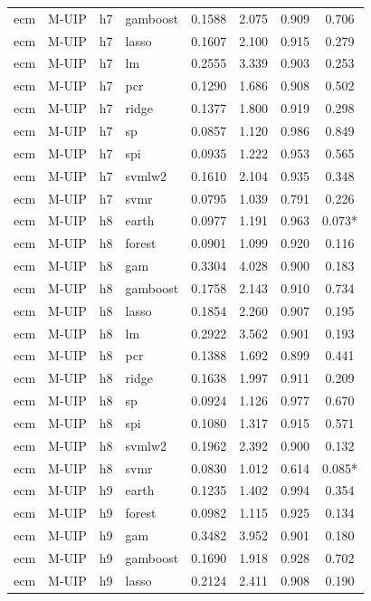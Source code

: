 \begin{ThreePartTable}
\begin{longtable}[t]{llclcccc}
ecm & M-UIP & h7 & gamboost & 0.1588 & 2.075 & 0.909 & 0.706\\
ecm & M-UIP & h7 & lasso & 0.1607 & 2.100 & 0.915 & 0.279\\
ecm & M-UIP & h7 & lm & 0.2555 & 3.339 & 0.903 & 0.253\\
ecm & M-UIP & h7 & pcr & 0.1290 & 1.686 & 0.908 & 0.502\\
ecm & M-UIP & h7 & ridge & 0.1377 & 1.800 & 0.919 & 0.298\\
ecm & M-UIP & h7 & sp & 0.0857 & 1.120 & 0.986 & 0.849\\
ecm & M-UIP & h7 & spi & 0.0935 & 1.222 & 0.953 & 0.565\\
ecm & M-UIP & h7 & svmlw2 & 0.1610 & 2.104 & 0.935 & 0.348\\
ecm & M-UIP & h7 & svmr & 0.0795 & 1.039 & 0.791 & 0.226\\
\addlinespace
ecm & M-UIP & h8 & earth & 0.0977 & 1.191 & 0.963 & 0.073*\\
ecm & M-UIP & h8 & forest & 0.0901 & 1.099 & 0.920 & 0.116\\
ecm & M-UIP & h8 & gam & 0.3304 & 4.028 & 0.900 & 0.183\\
ecm & M-UIP & h8 & gamboost & 0.1758 & 2.143 & 0.910 & 0.734\\
ecm & M-UIP & h8 & lasso & 0.1854 & 2.260 & 0.907 & 0.195\\
ecm & M-UIP & h8 & lm & 0.2922 & 3.562 & 0.901 & 0.193\\
ecm & M-UIP & h8 & pcr & 0.1388 & 1.692 & 0.899 & 0.441\\
ecm & M-UIP & h8 & ridge & 0.1638 & 1.997 & 0.911 & 0.209\\
ecm & M-UIP & h8 & sp & 0.0924 & 1.126 & 0.977 & 0.670\\
ecm & M-UIP & h8 & spi & 0.1080 & 1.317 & 0.915 & 0.571\\
ecm & M-UIP & h8 & svmlw2 & 0.1962 & 2.392 & 0.900 & 0.132\\
ecm & M-UIP & h8 & svmr & 0.0830 & 1.012 & 0.614 & 0.085*\\
\addlinespace
ecm & M-UIP & h9 & earth & 0.1235 & 1.402 & 0.994 & 0.354\\
ecm & M-UIP & h9 & forest & 0.0982 & 1.115 & 0.925 & 0.134\\
ecm & M-UIP & h9 & gam & 0.3482 & 3.952 & 0.901 & 0.180\\
ecm & M-UIP & h9 & gamboost & 0.1690 & 1.918 & 0.928 & 0.702\\
ecm & M-UIP & h9 & lasso & 0.2124 & 2.411 & 0.908 & 0.190\\

\end{longtable}
\end{ThreePartTable}
